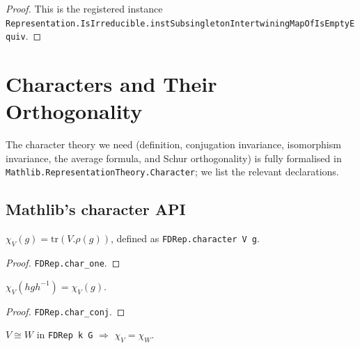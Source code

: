 \begin{proof}
  \leanok
  This is the registered instance
  \texttt{Representation.IsIrreducible.instSubsingletonIntertwiningMapOfIsEmptyEquiv}.
\end{proof}


\chapter{Characters and Their Orthogonality}
\label{chap:characters}

The character theory we need (definition, conjugation invariance, isomorphism
invariance, the average formula, and Schur orthogonality) is fully formalised
in \texttt{Mathlib.RepresentationTheory.Character}; we list the relevant
declarations.

\section{Mathlib's character API}
\label{sec:char-mathlib}

\begin{definition}
  \label{def:character}
  \mathlibok
  $\chi_V(g) = \mathrm{tr}(V.\rho(g))$, defined as
  \texttt{FDRep.character V g}.
\end{definition}

\begin{lemma}[$\chi_V(1) = \dim V$]
  \label{lem:char-one}
  \mathlibok
  \leanok
\end{lemma}

\begin{proof}\leanok{}
  \texttt{FDRep.char\_one}.
\end{proof}

\begin{lemma}
  \label{lem:char-conj}
  \mathlibok
  \leanok
  $\chi_V(hgh^{-1}) = \chi_V(g)$.
\end{lemma}

\begin{proof}\leanok{}
  \texttt{FDRep.char\_conj}.
\end{proof}

\begin{lemma}
  \label{lem:char-iso}
  \mathlibok
  \leanok
  $V \cong W$ in \texttt{FDRep k G} $\Rightarrow$ $\chi_V = \chi_W$.
\end{lemma}

